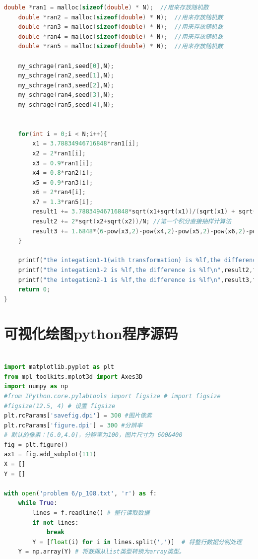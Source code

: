 \documentclass[a4paper,11pt]{article}
\begin{document}
\begin{appendices}
\begin{lstlisting}[language = C]
    double *ran1 = malloc(sizeof(double) * N);  //用来存放随机数
    double *ran2 = malloc(sizeof(double) * N);  //用来存放随机数
    double *ran3 = malloc(sizeof(double) * N);  //用来存放随机数
    double *ran4 = malloc(sizeof(double) * N);  //用来存放随机数
    double *ran5 = malloc(sizeof(double) * N);  //用来存放随机数

    my_schrage(ran1,seed[0],N);
    my_schrage(ran2,seed[1],N);
    my_schrage(ran3,seed[2],N);
    my_schrage(ran4,seed[3],N);
    my_schrage(ran5,seed[4],N);
    
    
    for(int i = 0;i < N;i++){
        x1 = 3.78834946716848*ran1[i];
        x2 = 2*ran1[i];
        x3 = 0.9*ran1[i];
        x4 = 0.8*ran2[i];
        x5 = 0.9*ran3[i];
        x6 = 2*ran4[i];
        x7 = 1.3*ran5[i];
        result1 += 3.78834946716848*sqrt(x1+sqrt(x1))/(sqrt(x1) + sqrt(sqrt(x1)))/N;  //第一个积分变换方法
        result2 += 2*sqrt(x2+sqrt(x2))/N; //第一个积分直接抽样计算法
        result3 += 1.6848*(6-pow(x3,2)-pow(x4,2)-pow(x5,2)-pow(x6,2)-pow(x7,2))/N;  //第二个积分直接抽样计算法
    }
    
    printf("the integation1-1(with transformation) is %lf,the difference is %lf\n",result1,fabs(result1-2.689521));   //第一个积分变换方法
    printf("the integation1-2 is %lf,the difference is %lf\n",result2,fabs(result2-2.689521));  //第一个积分直接抽样计算法
    printf("the integation2-1 is %lf,the difference is %lf\n",result3,fabs(result3-5.64408));  //第二个积分直接抽样计算法
    return 0;
}

\end{lstlisting}

\newpage

\section{可视化绘图python程序源码}

\begin{lstlisting}[language = python]

import matplotlib.pyplot as plt
from mpl_toolkits.mplot3d import Axes3D
import numpy as np
#from IPython.core.pylabtools import figsize # import figsize
#figsize(12.5, 4) # 设置 figsize
plt.rcParams['savefig.dpi'] = 300 #图片像素
plt.rcParams['figure.dpi'] = 300 #分辨率
# 默认的像素：[6.0,4.0]，分辨率为100，图片尺寸为 600&400
fig = plt.figure()
ax1 = fig.add_subplot(111)
X = []
Y = []

with open('problem 6/p_108.txt', 'r') as f:
    while True:
        lines = f.readline() # 整行读取数据
        if not lines:
            break
        Y = [float(i) for i in lines.split(',')]  # 将整行数据分割处理
    Y = np.array(Y) # 将数据从list类型转换为array类型。



\end{lstlisting}
\end{appendices}
\end{document}
